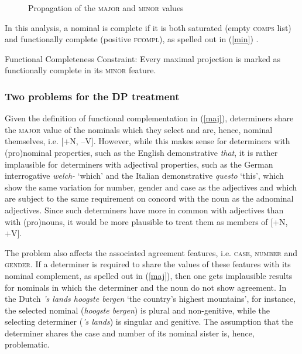 \documentclass[output=paper
	        ,collection
	        ,collectionchapter
 	        ,biblatex
                ,babelshorthands
                ,newtxmath
                ,draftmode
                ,colorlinks, citecolor=brown
]{langscibook}
\begin{document}
\begin{figure}
\caption{\label{netter} Propagation of the \textsc{major} and \textsc{minor} values}
\end{figure}

In this analysis, a nominal is complete if it is both saturated 
(empty \textsc{comps} list) and functionally complete (positive \textsc{fcompl}), as 
spelled out in (\ref{min}) \citep[312]{Netter94}.

\begin{exe} 
\ex\label{min} Functional Completeness Constraint: Every maximal projection is marked  
      as functionally complete in its \textsc{minor} feature. 
\end{exe}



\subsubsection{Two problems for the DP treatment}  
\label{prob}


Given the definition of functional complementation in (\ref{maj}), 
determiners share the \textsc{major} value of the nominals which they select
and are, hence, nominal themselves, i.e. [+N, --V].
However, while this makes sense for determiners with (pro)nominal properties,
such as the English demonstrative \emph{that}, 
it is rather implausible for determiners with adjectival properties,
such as the German interrogative \emph{welch-} `which' and 
the Italian demonstrative \emph{questo} `this', which show the same variation for 
number, gender and case as the adjectives and which are subject to 
the same requirement on concord with the noun as the adnominal adjectives. 
Since such determiners have more in common with adjectives than with (pro)nouns,  
it would be more plausible to treat them as members of [+N, +V].  

The problem also affects the associated agreement features, i.e. \textsc{case}, 
\textsc{number} and \textsc{gender}. If a determiner 
is required to share the values of these features with its nominal complement,
as spelled out in (\ref{maj}), then one gets implausible results for nominals in 
which the determiner and the noun do not show agreement.    
In the Dutch \emph{'s lands hoogste bergen} `the country's highest mountains', 
for instance, the selected nominal (\emph{hoogste bergen}) is plural and non-genitive, 
while the selecting determiner (\emph{'s lands}) is singular and genitive.  
The assumption that the determiner shares the case and number of its nominal sister 
is, hence, problematic.
\end{document}
